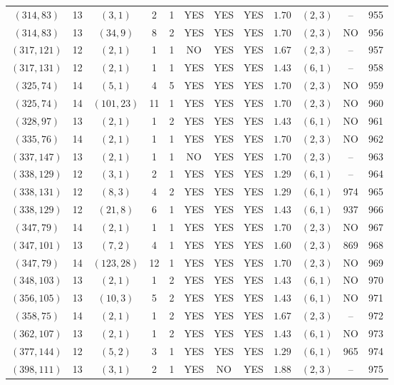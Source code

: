 \begin{longtable}{|c|c|c|c|c|c|c|c|c|c|c|c|}
$(314,83)$ & 13 & $(3,1)$ & 2 & 1 & YES & YES & YES & $1.70$ & $(2,3)$ & -- & 955\\
$(314,83)$ & 13 & $(34,9)$ & 8 & 2 & YES & YES & YES & $1.70$ & $(2,3)$ & NO & 956\\
$(317,121)$ & 12 & $(2,1)$ & 1 & 1 & NO & YES & YES & $1.67$ & $(2,3)$ & -- & 957\\
$(317,131)$ & 12 & $(2,1)$ & 1 & 1 & YES & YES & YES & $1.43$ & $(6,1)$ & -- & 958\\
$(325,74)$ & 14 & $(5,1)$ & 4 & 5 & YES & YES & YES & $1.70$ & $(2,3)$ & NO & 959\\
$(325,74)$ & 14 & $(101,23)$ & 11 & 1 & YES & YES & YES & $1.70$ & $(2,3)$ & NO & 960\\
$(328,97)$ & 13 & $(2,1)$ & 1 & 2 & YES & YES & YES & $1.43$ & $(6,1)$ & NO & 961\\
$(335,76)$ & 14 & $(2,1)$ & 1 & 1 & YES & YES & YES & $1.70$ & $(2,3)$ & NO & 962\\
$(337,147)$ & 13 & $(2,1)$ & 1 & 1 & NO & YES & YES & $1.70$ & $(2,3)$ & -- & 963\\
$(338,129)$ & 12 & $(3,1)$ & 2 & 1 & YES & YES & YES & $1.29$ & $(6,1)$ & -- & 964\\
$(338,131)$ & 12 & $(8,3)$ & 4 & 2 & YES & YES & YES & $1.29$ & $(6,1)$ & 974 & 965\\
$(338,129)$ & 12 & $(21,8)$ & 6 & 1 & YES & YES & YES & $1.43$ & $(6,1)$ & 937 & 966\\
$(347,79)$ & 14 & $(2,1)$ & 1 & 1 & YES & YES & YES & $1.70$ & $(2,3)$ & NO & 967\\
$(347,101)$ & 13 & $(7,2)$ & 4 & 1 & YES & YES & YES & $1.60$ & $(2,3)$ & 869 & 968\\
$(347,79)$ & 14 & $(123,28)$ & 12 & 1 & YES & YES & YES & $1.70$ & $(2,3)$ & NO & 969\\
$(348,103)$ & 13 & $(2,1)$ & 1 & 2 & YES & YES & YES & $1.43$ & $(6,1)$ & NO & 970\\
$(356,105)$ & 13 & $(10,3)$ & 5 & 2 & YES & YES & YES & $1.43$ & $(6,1)$ & NO & 971\\
$(358,75)$ & 14 & $(2,1)$ & 1 & 2 & YES & YES & YES & $1.67$ & $(2,3)$ & -- & 972\\
$(362,107)$ & 13 & $(2,1)$ & 1 & 2 & YES & YES & YES & $1.43$ & $(6,1)$ & NO & 973\\
$(377,144)$ & 12 & $(5,2)$ & 3 & 1 & YES & YES & YES & $1.29$ & $(6,1)$ & 965 & 974\\
$(398,111)$ & 13 & $(3,1)$ & 2 & 1 & YES & NO & YES & $1.88$ & $(2,3)$ & -- & 975\\

\end{longtable}
